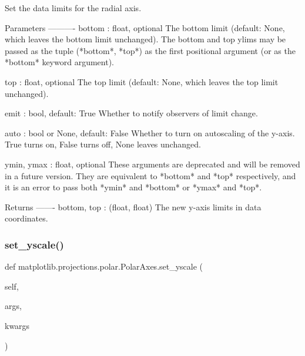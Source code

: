 \begin{DoxyVerb}Set the data limits for the radial axis.

Parameters
----------
bottom : float, optional
    The bottom limit (default: None, which leaves the bottom
    limit unchanged).
    The bottom and top ylims may be passed as the tuple
    (*bottom*, *top*) as the first positional argument (or as
    the *bottom* keyword argument).

top : float, optional
    The top limit (default: None, which leaves the top limit
    unchanged).

emit : bool, default: True
    Whether to notify observers of limit change.

auto : bool or None, default: False
    Whether to turn on autoscaling of the y-axis. True turns on,
    False turns off, None leaves unchanged.

ymin, ymax : float, optional
    These arguments are deprecated and will be removed in a future
    version.  They are equivalent to *bottom* and *top* respectively,
    and it is an error to pass both *ymin* and *bottom* or
    *ymax* and *top*.

Returns
-------
bottom, top : (float, float)
    The new y-axis limits in data coordinates.
\end{DoxyVerb}
 \mbox{\label{classmatplotlib_1_1projections_1_1polar_1_1PolarAxes_a67af0bf942e2a32f949126f39789550d}} 
\subsubsection{\texorpdfstring{set\+\_\+yscale()}{set\_yscale()}}
{\footnotesize\ttfamily def matplotlib.\+projections.\+polar.\+Polar\+Axes.\+set\+\_\+yscale (\begin{DoxyParamCaption}\item[{}]{self,  }\item[{}]{args,  }\item[{}]{kwargs }\end{DoxyParamCaption})}

\mbox{\label{classmatplotlib_1_1projections_1_1polar_1_1PolarAxes_aeff38b4b12256b83bff7fe5621b27c54}} 
